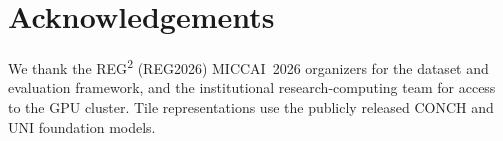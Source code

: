 \documentclass[11pt,a4paper]{article}
\begin{document}
\section*{Acknowledgements}
We thank the REG\textsuperscript{2} (REG2026) MICCAI~2026 organizers for the dataset and
evaluation framework, and the institutional research-computing team for access to the GPU
cluster. Tile representations use the publicly released CONCH and UNI foundation models.



\end{document}
